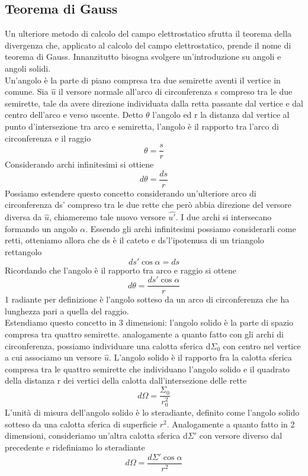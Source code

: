 \documentclass[10pt,a4paper]{article}
\begin{document}
\subsection{Teorema di Gauss}
Un ulteriore metodo di calcolo del campo elettrostatico sfrutta il teorema della divergenza che, applicato al calcolo del campo elettrostatico, prende il nome di teorema di Gauss. Innanzitutto bisogna svolgere un'introduzione su angoli e angoli solidi.\\
Un'angolo è la parte di piano compresa tra due semirette aventi il vertice in comune. Sia $\hat{u}$ il versore normale all'arco di circonferenza s compreso tra le due semirette, tale da avere direzione individuata dalla retta passante dal vertice e dal centro dell'arco e verso uscente. Detto $\theta$ l'angolo ed r la distanza dal vertice al punto d'intersezione tra arco e semiretta, l'angolo è il rapporto tra l'arco di circonferenza e il raggio 
\[\theta =\frac{s}{r}\]
Considerando archi infinitesimi si ottiene
\[d\theta = \frac{ds}{r}\] 
Possiamo estendere questo concetto considerando un'ulteriore arco di circonferenza ds' compreso tra le due rette che però abbia direzione del versore diversa da $\hat{u}$, chiameremo tale nuovo versore $\hat{u'}$. I due archi si intersecano formando un angolo $\alpha$. Essendo gli archi infinitesimi possiamo considerarli come retti, otteniamo allora che ds è il cateto e ds'l'ipotenusa di un triangolo rettangolo
\[ds' \cos\alpha = ds\]
Ricordando che l'angolo è il rapporto tra arco e raggio si ottene
\[d\theta = \frac{ds'\cos\alpha}{r}\]
1 radiante per definizione è l'angolo sotteso da un arco di circonferenza che ha lunghezza pari a quella del raggio.\\
Estendiamo questo concetto in 3 dimensioni: l'angolo solido è la parte di spazio compresa tra quattro semirette. analogamente a quanto fatto con gli archi di circonferenza, possiamo individuare una calotta sferica d$\Sigma_0$ con centro nel vertice a cui associamo un versore $\hat{u}$. L'angolo solido è il rapporto fra la calotta sferica compresa tra le quattro semirette che individuano l'angolo solido e il quadrato della distanza r dei vertici della calotta dall'intersezione delle rette
\[d\Omega = \frac{\Sigma_0}{r_0^2}\]
L'unità di misura dell'angolo solido è lo steradiante, definito come l'angolo solido sotteso da una calotta sferica di superficie \(r^2\). Analogamente a quanto fatto in 2 dimensioni, consideriamo un'altra calotta sferica d$\Sigma'$ con versore diverso dal precedente e ridefiniamo lo steradiante
\[d\Omega = \frac{d\Sigma'\cos\alpha}{r^2}\] 
\end{document}
